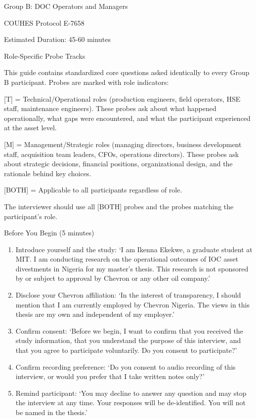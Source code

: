 Group B: DOC Operators and Managers

COUHES Protocol E-7658

Estimated Duration: 45-60 minutes

Role-Specific Probe Tracks

This guide contains standardized core questions asked identically to
every Group B participant. Probes are marked with role indicators:

{[}T{]} = Technical/Operational roles (production engineers, field
operators, HSE staff, maintenance engineers). These probes ask about
what happened operationally, what gaps were encountered, and what the
participant experienced at the asset level.

{[}M{]} = Management/Strategic roles (managing directors, business
development staff, acquisition team leaders, CFOs, operations
directors). These probes ask about strategic decisions, financial
positions, organizational design, and the rationale behind key choices.

{[}BOTH{]} = Applicable to all participants regardless of role.

The interviewer should use all {[}BOTH{]} probes and the probes matching
the participant's role.

Before You Begin (5 minutes)

\begin{enumerate}
\def\labelenumi{\arabic{enumi}.}
\item
  Introduce yourself and the study: `I am Ikenna Ekekwe, a graduate
  student at MIT. I am conducting research on the operational outcomes
  of IOC asset divestments in Nigeria for my master's thesis. This
  research is not sponsored by or subject to approval by Chevron or any
  other oil company.'
\item
  Disclose your Chevron affiliation: `In the interest of transparency, I
  should mention that I am currently employed by Chevron Nigeria. The
  views in this thesis are my own and independent of my employer.'
\item
  Confirm consent: `Before we begin, I want to confirm that you received
  the study information, that you understand the purpose of this
  interview, and that you agree to participate voluntarily. Do you
  consent to participate?'
\item
  Confirm recording preference: `Do you consent to audio recording of
  this interview, or would you prefer that I take written notes only?'
\item
  Remind participant: `You may decline to answer any question and may
  stop the interview at any time. Your responses will be de-identified.
  You will not be named in the thesis.'
\end{enumerate}

